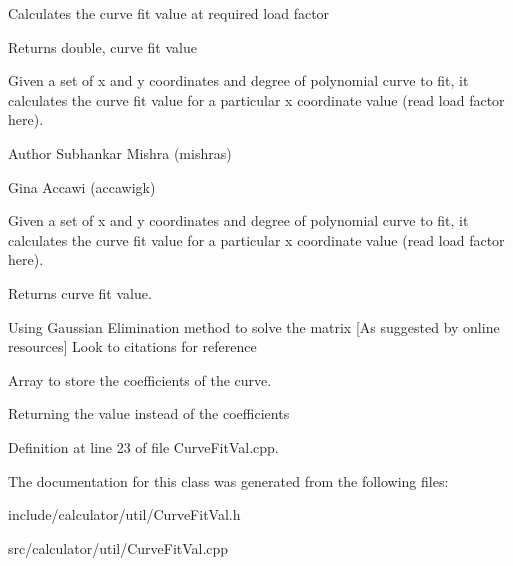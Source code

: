 Calculates the curve fit value at required load factor \begin{DoxyReturn}{Returns}
double, curve fit value
\end{DoxyReturn}
Given a set of x and y coordinates and degree of polynomial curve to fit, it calculates the curve fit value for a particular x coordinate value (read load factor here).

\begin{DoxyAuthor}{Author}
Subhankar Mishra (mishras) 

Gina Accawi (accawigk) 
\end{DoxyAuthor}
Given a set of x and y coordinates and degree of polynomial curve to fit, it calculates the curve fit value for a particular x coordinate value (read load factor here). \begin{DoxyReturn}{Returns}
curve fit value. 
\end{DoxyReturn}
Using Gaussian Elimination method to solve the matrix \mbox{[}As suggested by online resources\mbox{]} Look to citations for reference

Array to store the coefficients of the curve.

Returning the value instead of the coefficients

Definition at line 23 of file Curve\+Fit\+Val.\+cpp.



The documentation for this class was generated from the following files\+:\begin{DoxyCompactItemize}
\item 
include/calculator/util/Curve\+Fit\+Val.\+h\item 
src/calculator/util/Curve\+Fit\+Val.\+cpp\end{DoxyCompactItemize}
